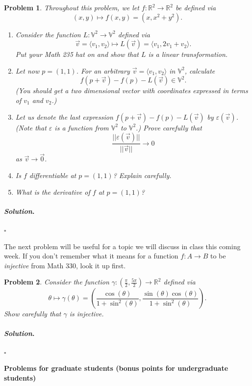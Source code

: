 \documentclass[reqno]{amsart}
\theoremstyle{plain}
\newtheorem{problem}{Problem}
\theoremstyle{definition}
\newenvironment{solution}{\paragraph{\emph{Solution}.}}{\hfill$\square$}
\begin{document}
\begin{problem}
Throughout this problem, we let $f:\mathbb{R}^{2} \rightarrow \mathbb{R}^{2}$ be defined via
$$(x,y) \mapsto f(x,y) = (x,x^{2} + y^{2}). $$
\begin{enumerate}
\item Consider the function $L:\mathbb{V}^{2} \rightarrow \mathbb{V}^{2}$ defined via
$$\vec{v} = \langle v_{1},v_{2} \rangle \mapsto L(\vec{v}) = \langle v_{1},2v_{1} + v_{2} \rangle. $$
Put your Math 235 hat on and show that $L$ is a linear transformation.
\item Let now $p = (1,1)$.  For an arbitrary $\vec{v} = \langle v_{1}, v_{2} \rangle$ in $\mathbb{V}^{2}$, calculate
$$f(p + \vec{v}) - f(p) - L(\vec{v}) \in \mathbb{V}^{2}. $$
(You should get a two dimensional vector with coordinates expressed in terms of $v_{1}$ and $v_{2}$.)
\item Let us denote the last expression $f(p + \vec{v}) - f(p) - L(\vec{v})$ by $\varepsilon(\vec{v})$.  (Note that $\varepsilon$ is a function from $\mathbb{V}^{2}$ to $\mathbb{V}^{2}$.)  Prove carefully that
$$\frac{||\varepsilon(\vec{v})||}{||\vec{v}||} \to 0 $$
as $\vec{v} \to \vec{0}$.
\item Is $f$ differentiable at $p = (1,1)$?  Explain carefully.
\item What is the derivative of $f$ at $p = (1,1)$?
\end{enumerate}
\end{problem}
\begin{solution}

\end{solution}

The next problem will be useful for a topic we will discuss in class this coming week.  If you don't remember what it means for a function $f:A \rightarrow B$ to be \emph{injective} from Math 330, look it up first.

\begin{problem}
Consider the function $\gamma:\left(\frac{\pi}{2},\frac{5 \pi}{2} \right) \rightarrow \mathbb{R}^{2}$ defined via
$$\theta \mapsto \gamma(\theta) = \left(\frac{\cos(\theta)}{1+\sin^{2}(\theta)},\frac{\sin(\theta) \cos(\theta)}{1+\sin^{2}(\theta)} \right). $$
Show carefully that $\gamma$ is injective.
\end{problem}
\begin{solution}

\end{solution}

\flushleft
{\bfseries Problems for graduate students (bonus points for undergraduate students)}
\end{document}
